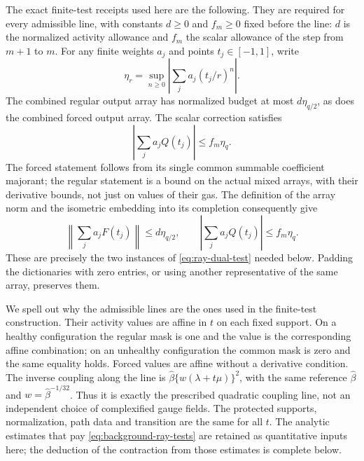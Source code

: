 The exact finite-test receipts used here are the following. They are
required for every admissible line, with constants $d\ge0$ and
$f_m\ge0$ fixed before the line: $d$ is the normalized activity
allowance and $f_m$ the scalar allowance of the step from $m+1$ to
$m$. For any finite weights $a_j$ and points $t_j\in[-1,1]$, write
\[
 \eta_r=\sup_{n\ge0}\left|\sum_j a_j(t_j/r)^n\right|.
\]
The combined regular output array has normalized budget at most
$d\eta_{q/2}$, as does the combined forced output array. The
scalar correction satisfies
\[
                   \left|\sum_j a_jQ(t_j)\right|
                          \le f_m\eta_q.
\]
The forced statement follows from its single common summable
coefficient majorant; the regular statement is a bound on the
actual mixed arrays, with their derivative bounds, not just on
values of their gas. The definition of the array norm and the
isometric embedding into its completion consequently give
\begin{equation}\label{eq:background-ray-tests}
 \left\|\sum_j a_jF(t_j)\right\|\le d\eta_{q/2},\qquad
                 \left|\sum_j a_jQ(t_j)\right|\le f_m\eta_q.
\end{equation}
These are precisely the two instances of
\eqref{eq:ray-dual-test} needed below. Padding the dictionaries
with zero entries, or using another representative of the same
array, preserves them.

We spell out why the admissible lines are the ones used in the
finite-test construction. Their activity values are affine in $t$
on each fixed support. On a healthy configuration the regular mask
is one and the value is the corresponding affine combination;
on an unhealthy configuration the common mask is zero and the
same equality holds. Forced values are affine without a derivative
condition. The inverse coupling along the line is
$\widehat\beta\{w(\lambda+t\mu)\}^2$, with the same reference
$\widehat\beta$ and $w=\widehat\beta^{-1/32}$. Thus it is exactly
the prescribed quadratic coupling line, not an independent choice
of complexified gauge fields. The protected supports, normalization,
path data and transition are the same for all $t$.
The analytic estimates that pay \eqref{eq:background-ray-tests}
are retained as quantitative inputs here; the deduction of the
contraction from those estimates is complete below.

